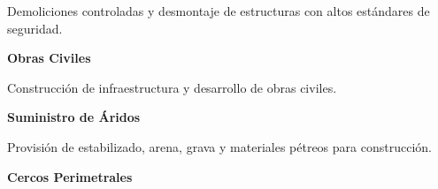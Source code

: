 \documentclass[a4paper,11pt]{article}
\begin{document}
{{\begin{center}
\begin{minipage}{18cm}
\begin{minipage}[t]{5.5cm}
{{                    \vspace{0.3cm}
                    
                    {\small Demoliciones controladas y desmontaje de estructuras con altos estándares de seguridad.}
                    \vspace{0.5cm}
                }}
            \end{minipage}
            \hfill
            \begin{minipage}[t]{5.5cm}
                \colorbox{blancoJM}{\parbox[t][4.5cm][t]{5.3cm}{
                    \vspace{0.5cm}
                    \centering
                    {\color{naranjaJM}\faBuilding\quad}{\Large\color{azulJM}\textbf{Obras Civiles}}
                    
                    \vspace{0.3cm}
                    
                    {\small Construcción de infraestructura y desarrollo de obras civiles.}
                    \vspace{0.5cm}
                }}
            \end{minipage}
            
            \vspace{0.8cm}
            
            \begin{minipage}[t]{5.5cm}
                \colorbox{blancoJM}{\parbox[t][4.5cm][t]{5.3cm}{
                    \vspace{0.5cm}
                    \centering
                    {\color{naranjaJM}\faCubes\quad}{\Large\color{azulJM}\textbf{Suministro de Áridos}}
                    
                    \vspace{0.3cm}
                    
                    {\small Provisión de estabilizado, arena, grava y materiales pétreos para construcción.}
                    \vspace{0.5cm}
                }}
            \end{minipage}
            \hfill
            \begin{minipage}[t]{5.5cm}
                \colorbox{blancoJM}{\parbox[t][4.5cm][t]{5.3cm}{
                    \vspace{0.5cm}
                    \centering
                    {\color{naranjaJM}\faBorderAll\quad}{\Large\color{azulJM}\textbf{Cercos Perimetrales}}
                    
}}
\end{minipage}
\end{minipage}
\end{center}}}
\end{document}
